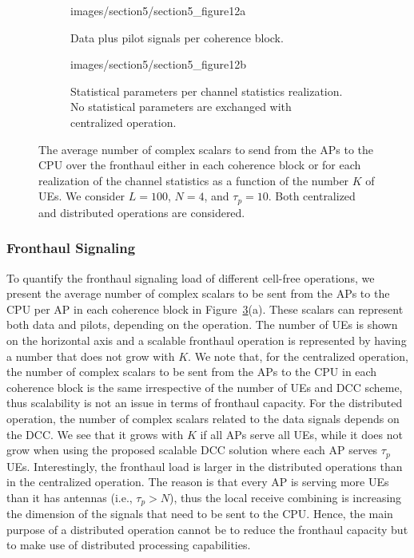 \begin{figure}[p!]
        \begin{subfigure}[b]{\columnwidth} \centering 
	\begin{overpic}[width=0.88\columnwidth,tics=10]{images/section5/section5_figure12a}
\end{overpic} \label{figureSec5_8a} 
                \caption{Data plus pilot signals per coherence block.} 
                \vspace{4mm}
        \end{subfigure} 
        \begin{subfigure}[b]{\columnwidth} \centering 
	\begin{overpic}[width=0.88\columnwidth,tics=10]{images/section5/section5_figure12b}
\end{overpic} \label{figureSec5_8b}
                \caption{Statistical parameters per channel statistics realization. No statistical parameters are  exchanged with centralized operation.} 
        \end{subfigure} 
	\caption{The average number of complex scalars to send from the  APs  to the CPU over the fronthaul either in each coherence block or for each realization of the channel statistics as a function of the number $K$ of UEs. We consider $L=100$, $N=4$, and $\tau_p=10$. Both centralized and distributed operations are considered.}\label{figureSec5_8}
\end{figure}

\enlargethispage{\baselineskip} 

\subsubsection{Fronthaul Signaling}

To quantify the fronthaul signaling load of different cell-free operations, we present the average number of complex scalars to be sent from the APs to the CPU per AP in each coherence block in Figure~\ref{figureSec5_8}(a). These scalars can represent both data and pilots, depending on the operation. The number of UEs is shown on the horizontal axis and a scalable fronthaul operation is represented by having a number that does not grow with $K$.
We note that, for the centralized operation, the number of complex scalars to be sent from the APs to the CPU in each coherence block is the same irrespective of the number of UEs and DCC scheme, thus scalability is not an issue in terms of fronthaul capacity.
For the distributed operation, the number of complex scalars related to the data signals depends on the DCC. We see that it grows with $K$ if all APs serve all UEs, while it does not grow when using the proposed scalable DCC solution where each AP serves $\tau_p$ UEs.
Interestingly, the fronthaul load is larger in the distributed operations than in the centralized operation. The reason is that every AP is serving more UEs than it has antennas (i.e., $\tau_p > N$), thus the local receive combining is increasing the dimension of the signals that need to be sent to the CPU. Hence, the main purpose of a distributed operation cannot be to reduce the fronthaul capacity but to make use of distributed processing capabilities.

